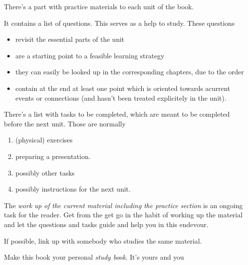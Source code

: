 \documentclass[../main.tex]{subfiles}
\begin{document}
There's a part with practice materials to each unit of the book. %

It contains a list of questions. This serves as a help to study. These questions
\begin{itemize}
\item revisit the essential parts of the unit
\item are a starting point to a feasible learning strategy
\item they can easily be looked up in the corresponding chapters, due to the order
\item contain at the end at least one point which is oriented towards acurrent events or connections
  (and hasn't been treated explicitely in the unit).
\end{itemize}

\noindent There's a list with tasks to be completed, which are meant to be completed before the next unit.
Those are normally
\begin{enumerate}[label = \Alph*]
\item (physical) exercises
\item preparing a presentation.
\item possibly other tasks
  \item possibly instructions for the next unit. %
\end{enumerate}


\noindent The \emph{work up of the current material including the practice section} is an ongoing task for the reader.
Get from the get go in the habit of working up the material and let the questions and tasks guide and help you in this endevour.

If possible, link up with somebody who studies the same material.

Make this book your personal \emph{study book}. It's yours and you 
\end{document}
